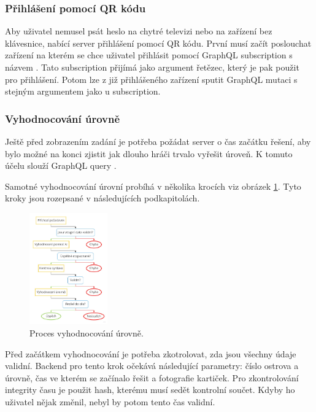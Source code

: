 \subsubsection{Přihlášení pomocí QR kódu}
Aby uživatel nemusel psát heslo na chytré televizi nebo na zařízení bez klávesnice, nabící server přihlášení pomocí QR kódu. První musí začít poslouchat zařízení na kterém se chce uživatel přihlásit pomocí GraphQL subscription s názvem . Tato subscription přijímá jako argument řetězec, který je pak použit pro přihlášení. Potom lze z již přihlášeného zařízení sputit GraphQL mutaci  s stejným argumentem jako u subscription.

\subsubsection{Vyhodnocování úrovně}
Ještě před zobrazením zadání je potřeba požádat server o čas začátku řešení, aby bylo možné na konci zjistit jak dlouho hráči trvalo vyřešit úroveň. K tomuto účelu slouží GraphQL query .\par
Samotné vyhodnocování úrovní probíhá v několika krocích viz obrázek \ref{fig:proces-vyhodnocovani}. Tyto kroky jsou rozepsané v následujících podkapitolách.

\begin{figure}[h]
    \centering
    \includegraphics[width=0.3\textwidth]{img/proces.jpg}
    \caption{Proces vyhodnocování úrovně.}
    \label{fig:proces-vyhodnocovani}
\end{figure}

Před začátkem vyhodnocování je potřeba zkotrolovat, zda jsou všechny údaje validní. Backend pro tento krok očekává následující parametry: číslo ostrova a úrovně, čas ve kterém se začínalo řešit a fotografie kartiček. Pro zkontrolování integrity času je použit hash, kterému musí sedět kontrolní součet. Kdyby ho uživatel nějak změnil, nebyl by potom tento čas validní.

